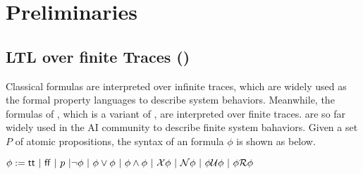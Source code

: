 \section{Preliminaries}
\subsection{LTL over finite Traces (\ltlf)}
Classical \ltl formulas are interpreted over infinite traces, which are widely used as the formal property languages to describe system behaviors. Meanwhile, the formulas of \ltlf, which is a variant of \ltl, are interpreted over finite traces. \ltlf are so far widely used in the AI community to describe finite system bahaviors. Given a set $P$ of atomic propositions, the syntax of an \ltlf formula $\phi$ is shown as below.

\begin{center}  
$\phi:=\tt\ |\ \ff\ |\ p\ |\neg\phi\ |\ \phi \vee \phi\ |\ \phi \wedge \phi\ |\ \X \phi\ |\ \N \phi\ |\ \phi \U \phi\ |\ \phi \R \phi$ 
\end{center}

